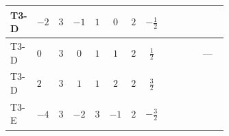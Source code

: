 \documentclass[8pt]{article}
\begin{document}
\begin{landscape}
\begin{longtable}{@{}llcccccc >{\raggedright\arraybackslash}p{0.21\linewidth} >{\raggedright\arraybackslash}p{0.21\linewidth} >{\raggedright\arraybackslash}p{0.21\linewidth}@{}}
\midrule
T3-D & $-2$ & $3$ & $-1$ & $1$ & $0$ & $2$ & $-\frac{1}{2}$ & \scriptsize\adjustbox{max width=\linewidth}{$\begin{gathered} +2 {\lambda_{S_1}^{(A)}} T_{\nu}^{(1)}\end{gathered}$} & \scriptsize\adjustbox{max width=\linewidth}{$\begin{gathered} +21 {g_2}^4\end{gathered}$} & \scriptsize\adjustbox{max width=\linewidth}{$\begin{gathered} +{g_1}^2 \left(12 {g_2}^2-12 {\lambda_{S_1}^{(1)}}-6 {\lambda_{S_1}^{(A)}}\right)\end{gathered}$} \\
\midrule
T3-D & $0$ & $3$ & $0$ & $1$ & $1$ & $2$ & $\frac{1}{2}$ & \scriptsize\adjustbox{max width=\linewidth}{$\begin{gathered} +2 {\lambda_{S_1}^{(A)}} T_{\nu}^{(1)}\end{gathered}$} & \scriptsize\adjustbox{max width=\linewidth}{$\begin{gathered} +21 {g_2}^4\end{gathered}$} & --- \\
\midrule
T3-D & $2$ & $3$ & $1$ & $1$ & $2$ & $2$ & $\frac{3}{2}$ & \scriptsize\adjustbox{max width=\linewidth}{$\begin{gathered} +2 {\lambda_{S_1}^{(A)}} T_{\nu}^{(1)}\end{gathered}$} & \scriptsize\adjustbox{max width=\linewidth}{$\begin{gathered} +21 {g_2}^4\end{gathered}$} & \scriptsize\adjustbox{max width=\linewidth}{$\begin{gathered} +{g_1}^2 \left(12 {g_2}^2-12 {\lambda_{S_1}^{(1)}}-6 {\lambda_{S_1}^{(A)}}\right)\end{gathered}$} \\
\midrule
T3-E & $-4$ & $3$ & $-2$ & $3$ & $-1$ & $2$ & $-\frac{3}{2}$ & \scriptsize\adjustbox{max width=\linewidth}{$\begin{gathered} +2 {\lambda_{S_1}^{(A)}} T_{\nu}^{(1)}\end{gathered}$} & \scriptsize\adjustbox{max width=\linewidth}{$\begin{gathered} +21 {g_2}^4\end{gathered}$} & \scriptsize\adjustbox{max width=\linewidth}{$\begin{gathered} +{g_1}^2 \left(48 {g_2}^2-48 {\lambda_{S_1}^{(1)}}-24 {\lambda_{S_1}^{(A)}}\right)\end{gathered}$} \\

\end{longtable}
\end{landscape}
\end{document}
